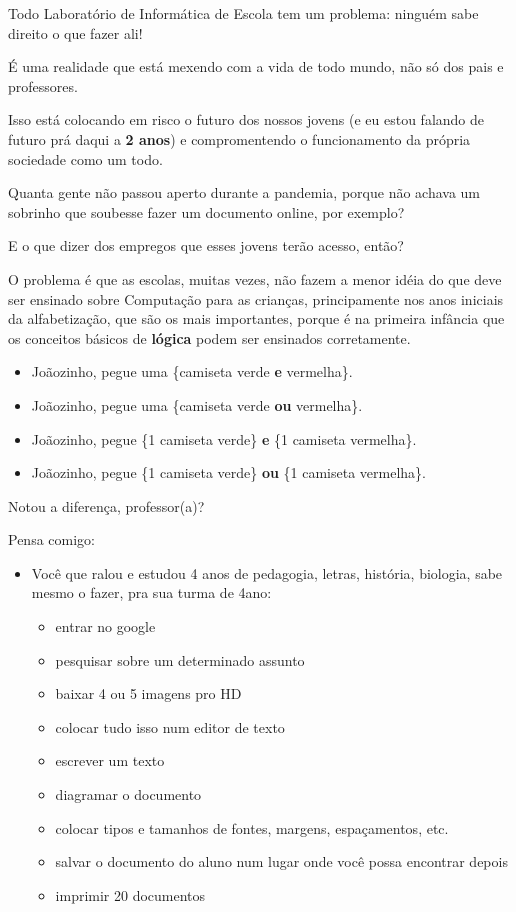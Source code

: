 \large \begin{multicols}{2}
Todo Laboratório de Informática de Escola tem um problema: ninguém sabe direito o que fazer ali!

É uma realidade que está mexendo com a vida de todo mundo, não só dos pais e professores.

Isso está colocando em risco o futuro dos nossos jovens (e eu estou falando de futuro prá daqui a \textbf{2 anos}) e compromentendo o funcionamento da própria sociedade como um todo.

Quanta gente não passou aperto durante a pandemia, porque não achava um sobrinho que soubesse fazer um documento online, por exemplo?

E o que dizer dos empregos que esses jovens terão acesso, então?

O problema é que as escolas, muitas vezes, não fazem a menor idéia do que deve ser ensinado sobre Computação para as crianças, principamente nos anos iniciais da alfabetização, que são os mais importantes, porque é na primeira infância que os conceitos básicos de \textbf{lógica} podem ser ensinados corretamente.

\begin{itemize}
\item Joãozinho, pegue uma \{camiseta verde \textbf{e} vermelha\}.

\item Joãozinho, pegue uma \{camiseta verde \textbf{ou} vermelha\}.

	\item Joãozinho, pegue \{1 camiseta verde\} \textbf{e} \{1 camiseta vermelha\}.
	
		\item Joãozinho, pegue \{1 camiseta verde\} \textbf{ou} \{1 camiseta vermelha\}.
\end{itemize}

Notou a diferença, professor(a)?

Pensa comigo:

\begin{itemize}
	\item Você que ralou e estudou 4 anos de pedagogia, letras, história, biologia, sabe mesmo o fazer, pra sua turma de 4\textordmasculine\space ano:

		\begin{itemize}
			\normalsize
		\item entrar no google
	\item pesquisar sobre um determinado assunto
	\item baixar 4 ou 5 imagens pro HD
	\item colocar tudo isso num editor de texto
	\item escrever um texto
	\item diagramar o documento
	\item colocar tipos e tamanhos de fontes, margens, espaçamentos, etc.
	\item salvar o documento do aluno num lugar onde você possa encontrar depois
	\item imprimir 20 documentos
	\end{itemize}
\end{itemize}


\end{multicols}
